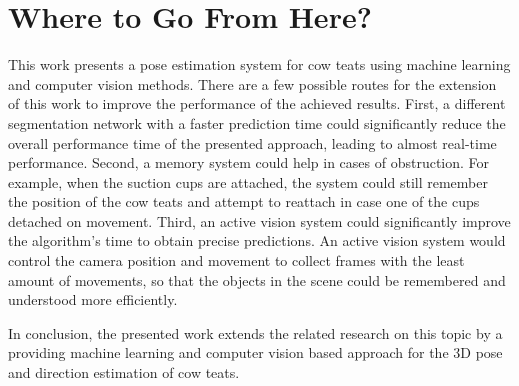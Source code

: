 \section{Where to Go From Here?}\label{sec:future-work}
This work presents a pose estimation system for cow teats using machine learning and computer vision methods. There are a few possible routes for the extension of this work to improve the performance of the achieved results. First, a different segmentation network with a faster prediction time could significantly reduce the overall performance time of the presented approach, leading to almost real-time performance. Second, a memory system could help in cases of obstruction. For example, when the suction cups are attached, the system could still remember the position of the cow teats and attempt to reattach in case one of the cups detached on movement. Third, an active vision system could significantly improve the algorithm's time to obtain precise predictions. An active vision system would control the camera position and movement to collect frames with the least amount of movements, so that the objects in the scene could be remembered and understood more efficiently.

In conclusion, the presented work extends the related research on this topic by a providing machine learning and computer vision based approach for the 3D pose and direction estimation of cow teats.


